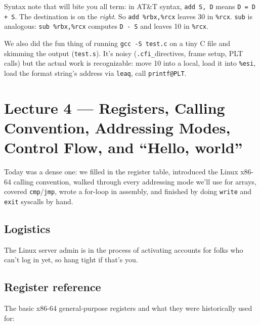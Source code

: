 \documentclass[11pt]{article}
\begin{document}
Syntax note that will bite you all term: in AT\&T syntax,
\texttt{add S, D} means \texttt{D = D + S}. The destination is on the
\emph{right}. So \texttt{add \%rbx,\%rcx} leaves 30 in
\texttt{\%rcx}. \texttt{sub} is analogous: \texttt{sub \%rbx,\%rcx}
computes \texttt{D - S} and leaves 10 in \texttt{\%rcx}.

We also did the fun thing of running \texttt{gcc -S test.c} on a tiny
C file and skimming the output (\texttt{test.s}). It's noisy
(\texttt{.cfi\_}directives, frame setup, PLT calls) but the actual
work is recognizable: move 10 into a local, load it into
\texttt{\%esi}, load the format string's address via \texttt{leaq},
call \texttt{printf@PLT}.

\section{Lecture 4 --- Registers, Calling Convention, Addressing Modes, Control Flow, and ``Hello, world''}

Today was a dense one: we filled in the register table, introduced the
Linux x86-64 calling convention, walked through every addressing mode
we'll use for arrays, covered \texttt{cmp}/\texttt{jmp}, wrote a
for-loop in assembly, and finished by doing \texttt{write} and
\texttt{exit} syscalls by hand.

\subsection*{Logistics}

The Linux server admin is in the process of activating accounts for
folks who can't log in yet, so hang tight if that's you.

\subsection*{Register reference}

The basic x86-64 general-purpose registers and what they were
historically used for:
\end{document}
